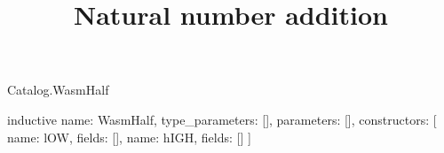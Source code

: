 \begin{lexlean}{Catalog.WasmHalf}
\title{Natural number addition}
\begin{semanticmodule}
inductive{
  name: WasmHalf,
  type_parameters: [],
  parameters: [],
  constructors: [
    {name: lOW, fields: []},
    {name: hIGH, fields: []}
  ]
}
\end{semanticmodule}
\end{lexlean}

